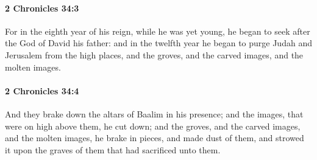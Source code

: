 		\paragraph{2 Chronicles 34:3} %
			\label{2CHRONICLES-34-3}

			For in the eighth year of his reign, while he was yet young, he began to seek after the God of David his father: and in the twelfth year he began to purge Judah and Jerusalem from the high places, and the groves, and the carved images, and the molten images.


		\paragraph{2 Chronicles 34:4} %
			\label{2CHRONICLES-34-4}

			And they brake down the altars of Baalim in his presence; and the images, that were on high above them, he cut down; and the groves, and the carved images, and the molten images, he brake in pieces, and made dust of them, and strowed it upon the graves of them that had sacrificed unto them.

